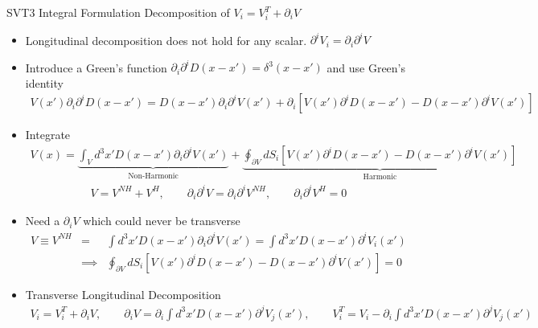 \documentclass[8pt,aspectratio=1610]{beamer}
\begin{document}

\begin{frame}{SVT3 Integral Formulation}
	Decomposition of $V_i = V_i^T + \partial_i V$
	\begin{itemize}
		\item Longitudinal decomposition does not hold for any scalar. $\partial^i V_i = \partial_i\partial^i V$
		\item Introduce a Green's function $\partial_i \partial^i D(x-x') = \delta^3(x-x')$ and use Green's identity
		\begin{eqnarray}
		V(x')\partial_i \partial^i D(x-x') = D(x-x')\partial_i \partial^i V(x') + \partial_i[V(x')\partial^i D(x-x') - D(x-x')\partial^i V(x')]
		\end{eqnarray}
		\item Integrate
		\begin{eqnarray}
		V(x) = \underbrace{\int_V d^3x' D(x-x')\partial_i \partial^i V(x')}_{\text{Non-Harmonic}} + \underbrace{\oint_{\partial V} dS_i[V(x')\partial^i D(x-x') - D(x-x')\partial^i V(x')]}_{\text{Harmonic}}
		\end{eqnarray}
		\begin{eqnarray}
		V = V^{NH} + V^{H},\qquad \partial_i\partial^i V = \partial_i\partial^i V^{NH},\qquad \partial_i\partial^i V^{H} = 0
		\end{eqnarray}
		\item Need a $\partial_i V$ which could never be transverse
		\begin{eqnarray}
		V \equiv V^{NH} &=& \int d^3x' D(x-x')\partial_i \partial^i V(x') = \int d^3x' D(x-x') \partial^i V_i(x')
		\nonumber\\
		&\implies& \oint_{\partial V} dS_i[V(x')\partial^i D(x-x') - D(x-x')\partial^i V(x')] = 0
		\end{eqnarray}
		\item Transverse Longitudinal Decomposition
		\begin{eqnarray}
		V_i = V_i^T + \partial_i V, \qquad \partial_i V = \partial_i \int d^3x' D(x-x')\partial^j V_j (x'),\qquad  V_i^T = V_i - \partial_i \int d^3x' D(x-x')\partial^j V_j (x')
		\end{eqnarray}
		
	\end{itemize}
\end{frame}

\end{document}

